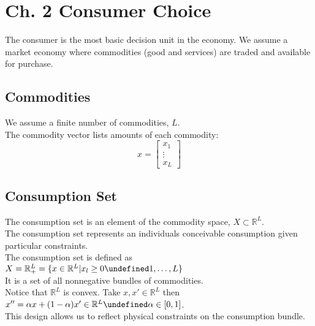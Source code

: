 \documentclass[12pt]{article}
\newcommand{\R}{\mathbb{R}}
\let\oldforall\forall
\let\forall\undefined
\DeclareMathOperator{\forall}{\,\oldforall\,}
\begin{document}
\section{Ch. 2 Consumer Choice}
The consumer is the most basic decision unit in the economy. We assume a market economy where commodities (good and services) are traded and available for purchase.

\subsection{Commodities}
We assume a finite number of commodities, $L$.
\\ The commodity vector lists amounts of each commodity:
\\ $$x = \begin{bmatrix} 
x_1 \\
\vdots \\
x_L 
\end{bmatrix}$$

\subsection{Consumption Set}
The consumption set is an element of the commodity space, $X \subset \R^L$. 
\\The consumption set represents an individuals conceivable consumption given particular constraints.
\\ The consumption set is defined as $X = \R_+^L = \{x \in \R^L | x_l \geq 0 \forall 1,\dots,L\}$
\\ It is a set of all nonnegative bundles of commodities.
\\ Notice that $\R^L$ is convex. Take $x,x' \in \R^L$ then $x'' = \alpha x + (1-\alpha)x' \in \R^L \forall \alpha \in [0,1]$.
\\ This design allows us to reflect physical constraints on the consumption bundle.
\end{document}
